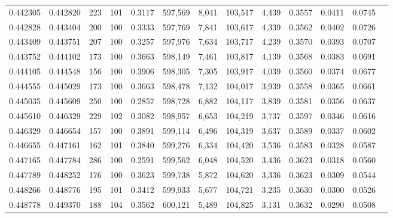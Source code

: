 \begin{tabular}{rrrrrrrrrrrrr}
0.442305 & 0.442820 &   223 & 101 &                                     0.3117 & 597,569 &   8,041 & 103,517 &   4,439 & 0.3557 & 0.0411 & 0.0745 \\
0.442828 & 0.443404 &   200 & 100 &                                     0.3333 & 597,769 &   7,841 & 103,617 &   4,339 & 0.3562 & 0.0402 & 0.0726 \\
0.443409 & 0.443751 &   207 & 100 &                                     0.3257 & 597,976 &   7,634 & 103,717 &   4,239 & 0.3570 & 0.0393 & 0.0707 \\
0.443752 & 0.444102 &   173 & 100 &                                     0.3663 & 598,149 &   7,461 & 103,817 &   4,139 & 0.3568 & 0.0383 & 0.0691 \\
0.444105 & 0.444548 &   156 & 100 &                                     0.3906 & 598,305 &   7,305 & 103,917 &   4,039 & 0.3560 & 0.0374 & 0.0677 \\
0.444555 & 0.445029 &   173 & 100 &                                     0.3663 & 598,478 &   7,132 & 104,017 &   3,939 & 0.3558 & 0.0365 & 0.0661 \\
0.445035 & 0.445609 &   250 & 100 &                                     0.2857 & 598,728 &   6,882 & 104,117 &   3,839 & 0.3581 & 0.0356 & 0.0637 \\
0.445610 & 0.446329 &   229 & 102 &                                     0.3082 & 598,957 &   6,653 & 104,219 &   3,737 & 0.3597 & 0.0346 & 0.0616 \\
0.446329 & 0.446654 &   157 & 100 &                                     0.3891 & 599,114 &   6,496 & 104,319 &   3,637 & 0.3589 & 0.0337 & 0.0602 \\
0.446655 & 0.447161 &   162 & 101 &                                     0.3840 & 599,276 &   6,334 & 104,420 &   3,536 & 0.3583 & 0.0328 & 0.0587 \\
0.447165 & 0.447784 &   286 & 100 &                                     0.2591 & 599,562 &   6,048 & 104,520 &   3,436 & 0.3623 & 0.0318 & 0.0560 \\
0.447789 & 0.448252 &   176 & 100 &                                     0.3623 & 599,738 &   5,872 & 104,620 &   3,336 & 0.3623 & 0.0309 & 0.0544 \\
0.448266 & 0.448776 &   195 & 101 &                                     0.3412 & 599,933 &   5,677 & 104,721 &   3,235 & 0.3630 & 0.0300 & 0.0526 \\
0.448778 & 0.449370 &   188 & 104 &                                     0.3562 & 600,121 &   5,489 & 104,825 &   3,131 & 0.3632 & 0.0290 & 0.0508 \\

\end{tabular}

